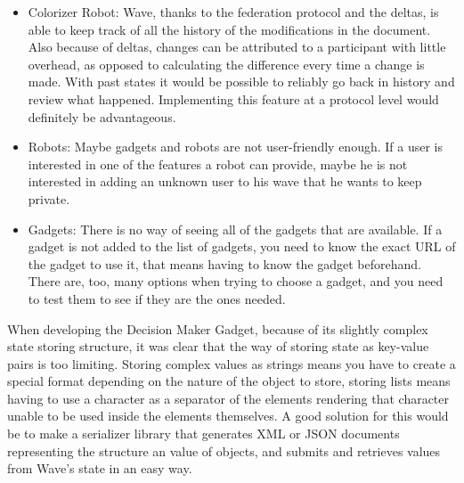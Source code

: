 \begin{itemize}
  \item Colorizer Robot: Wave, thanks to the federation protocol and the deltas, is able to keep track of all the history of the modifications in the document. Also because of deltas, changes can be attributed to a participant with little overhead, as opposed to calculating the difference every time a change is made. With past states it would be possible to reliably go back in history and review what happened. Implementing this feature at a protocol level would definitely be advantageous.
  \item Robots: Maybe gadgets and robots are not user-friendly enough. If a user is interested in one of the features a robot can provide, maybe he is not interested in adding an unknown user to his wave that he wants to keep private.
  \item Gadgets: There is no way of seeing all of the gadgets that are available. If a gadget is not added to the list of gadgets, you need to know the exact URL of the gadget to use it, that means having to know the gadget beforehand. There are, too, many options when trying to choose a gadget, and you need to test them to see if they are the ones needed.
\end{itemize}
When developing the Decision Maker Gadget, because of its slightly complex state storing structure, it was clear that the way of storing state as key-value pairs is too limiting. Storing complex values as strings means you have to create a special format depending on the nature of the object to store, storing lists means having to use a character as a separator of the elements rendering that character unable to be used inside the elements themselves. A good solution for this would be to make a serializer library that generates XML or JSON documents representing the structure an value of objects, and submits and retrieves values from Wave's state in an easy way.

\newpage
{}
